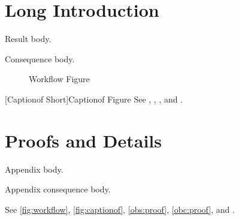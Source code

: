 \section[Short Intro]{Long Introduction}\label{sec:intro}
\begin{oblemma}\label{obs:main}
Result body.
\end{oblemma}
\begin{obcor}\label{obc:main}
Consequence body.
\end{obcor}
\begin{figure}\caption[Workflow Short]{Workflow Figure}\label{fig:workflow}\end{figure}
[Captionof Short]{Captionof Figure}\label{fig:captionof}
See , , , and .
\appendices
\section[Proof Notes]{Proofs and Details}\label{sec:proof}
\begin{oblemma}\label{obs:proof}
Appendix body.
\end{oblemma}
\begin{obcor}\label{obc:proof}
Appendix consequence body.
\end{obcor}
See \autoref{fig:workflow}, \autoref{fig:captionof}, \cref{obs:proof}, \cref{obc:proof}, and .
